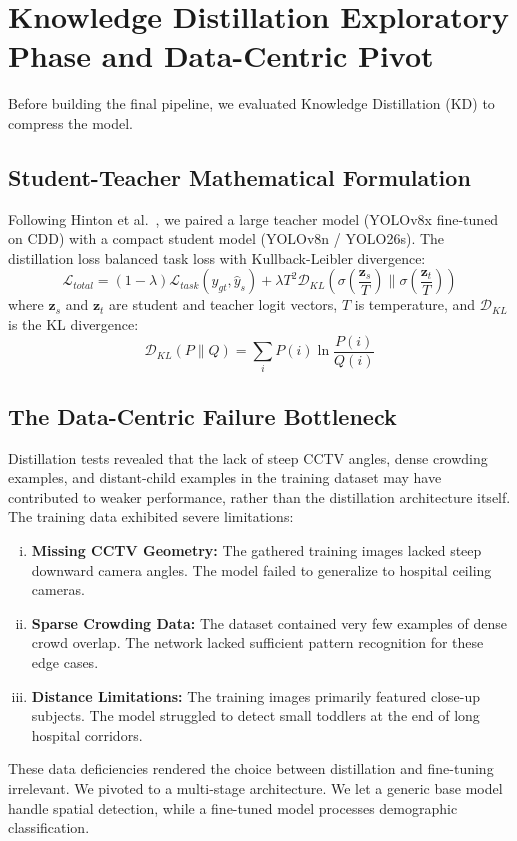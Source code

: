 \section{Knowledge Distillation Exploratory Phase and Data-Centric Pivot}
Before building the final pipeline, we evaluated Knowledge Distillation (KD) to compress the model.

\subsection{Student-Teacher Mathematical Formulation}
Following Hinton et al.\ \cite{hinton2015distilling}, we paired a large teacher model (YOLOv8x fine-tuned on CDD) with a compact student model (YOLOv8n / YOLO26s). The distillation loss balanced task loss with Kullback-Leibler divergence:
\begin{equation}
    \mathcal{L}_{total} = (1 - \lambda) \mathcal{L}_{task}(y_{gt}, \hat{y}_s) + \lambda T^2 \mathcal{D}_{KL}\left( \sigma\left(\frac{\mathbf{z}_s}{T}\right) \parallel \sigma\left(\frac{\mathbf{z}_t}{T}\right) \right)
\end{equation}
where $\mathbf{z}_s$ and $\mathbf{z}_t$ are student and teacher logit vectors, $T$ is temperature, and $\mathcal{D}_{KL}$ is the KL divergence:
\begin{equation}
    \mathcal{D}_{KL}(P \parallel Q) = \sum_{i} P(i) \ln \frac{P(i)}{Q(i)}
\end{equation}

\subsection{The Data-Centric Failure Bottleneck}
Distillation tests revealed that the lack of steep CCTV angles, dense crowding examples, and distant-child examples in the training dataset may have contributed to weaker performance, rather than the distillation architecture itself. The training data exhibited severe limitations:
\begin{enumerate}[(i)]
    \item \textbf{Missing CCTV Geometry:} The gathered training images lacked steep downward camera angles. The model failed to generalize to hospital ceiling cameras.
    \item \textbf{Sparse Crowding Data:} The dataset contained very few examples of dense crowd overlap. The network lacked sufficient pattern recognition for these edge cases.
    \item \textbf{Distance Limitations:} The training images primarily featured close-up subjects. The model struggled to detect small toddlers at the end of long hospital corridors.
\end{enumerate}
These data deficiencies rendered the choice between distillation and fine-tuning irrelevant. We pivoted to a multi-stage architecture. We let a generic base model handle spatial detection, while a fine-tuned model processes demographic classification.

